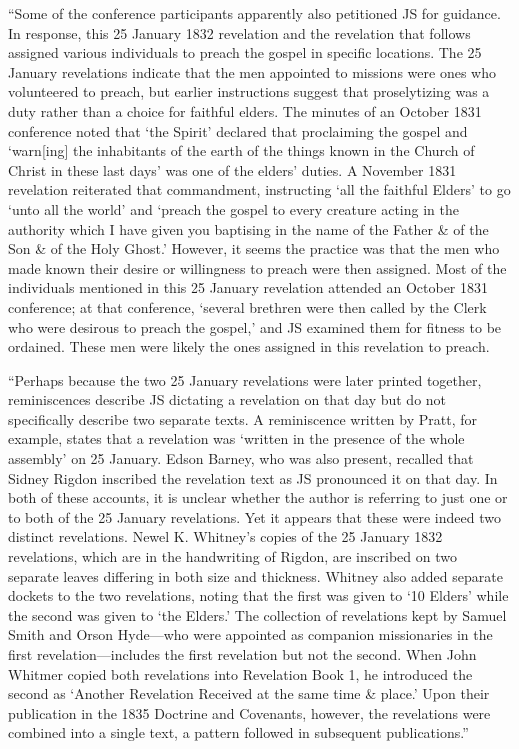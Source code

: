 				``Some of the conference participants apparently also petitioned JS for guidance. In response, this 25 January 1832 revelation and the revelation that follows assigned various individuals to preach the gospel in specific locations. The 25 January revelations indicate that the men appointed to missions were ones who volunteered to preach, but earlier instructions suggest that proselytizing was a duty rather than a choice for faithful elders. The minutes of an October 1831 conference noted that `the Spirit' declared that proclaiming the gospel and `warn[ing] the inhabitants of the earth of the things known in the Church of Christ in these last days' was one of the elders' duties. A November 1831 revelation reiterated that commandment, instructing `all the faithful Elders' to go `unto all the world' and `preach the gospel to every creature acting in the authority which I have given you baptising in the name of the Father \& of the Son \& of the Holy Ghost.' However, it seems the practice was that the men who made known their desire or willingness to preach were then assigned. Most of the individuals mentioned in this 25 January revelation attended an October 1831 conference; at that conference, `several brethren were then called by the Clerk who were desirous to preach the gospel,' and JS examined them for fitness to be ordained. These men were likely the ones assigned in this revelation to preach.

				``Perhaps because the two 25 January revelations were later printed together, reminiscences describe JS dictating a revelation on that day but do not specifically describe two separate texts. A reminiscence written by Pratt, for example, states that a revelation was `written in the presence of the whole assembly' on 25 January. Edson Barney, who was also present, recalled that Sidney Rigdon inscribed the revelation text as JS pronounced it on that day. In both of these accounts, it is unclear whether the author is referring to just one or to both of the 25 January revelations. Yet it appears that these were indeed two distinct revelations. Newel K. Whitney's copies of the 25 January 1832 revelations, which are in the handwriting of Rigdon, are inscribed on two separate leaves differing in both size and thickness. Whitney also added separate dockets to the two revelations, noting that the first was given to `10 Elders' while the second was given to `the Elders.' The collection of revelations kept by Samuel Smith and Orson Hyde---who were appointed as companion missionaries in the first revelation---includes the first revelation but not the second. When John Whitmer copied both revelations into Revelation Book 1, he introduced the second as `Another Revelation Received at the same time \& place.' Upon their publication in the 1835 Doctrine and Covenants, however, the revelations were combined into a single text, a pattern followed in subsequent publications.''
			
